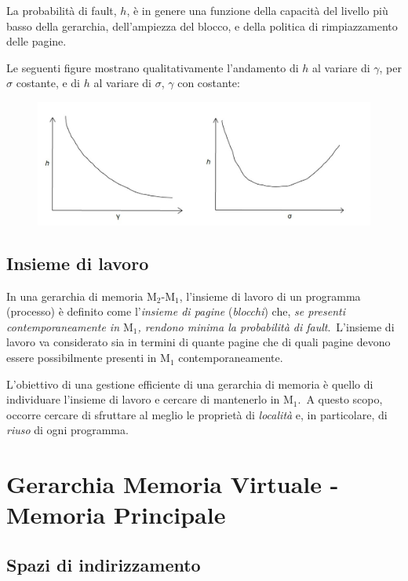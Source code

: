 La probabilità di fault, $h$, è in genere una funzione della capacità del livello più basso della gerarchia, dell'ampiezza del blocco, e della politica di rimpiazzamento delle pagine.

Le seguenti figure mostrano qualitativamente l'andamento di $h$ al variare di $\gamma$, per $\sigma$ costante, e di $h$ al variare di  $\sigma$, $\gamma$ con costante:

\begin{figure}[H]
    \centering
    \includegraphics[width=\textwidth]{immagini/Fault.jpg}
\end{figure}

\subsection{Insieme di lavoro}

In una gerarchia di memoria $\mathrm{M}_2\textrm{-}\mathrm{M}_1$, l'insieme di lavoro di un programma (processo) è definito come l'\textit{insieme di pagine} (\textit{blocchi}) che, \textit{se presenti contemporaneamente in $\mathrm{M}_1$, rendono minima la probabilità di fault}.\
L'insieme di lavoro va considerato sia in termini di quante pagine che di quali pagine devono essere possibilmente presenti in $\mathrm{M}_1$ contemporaneamente.

L'obiettivo di una gestione efficiente di una gerarchia di memoria è quello di individuare l'insieme di lavoro e cercare di mantenerlo in $\mathrm{M}_1$.\
A questo scopo, occorre cercare di sfruttare al meglio le proprietà di \textit{località} e, in particolare, di \textit{riuso} di ogni programma.

\section{Gerarchia Memoria Virtuale - Memoria Principale}

\subsection{Spazi di indirizzamento}

